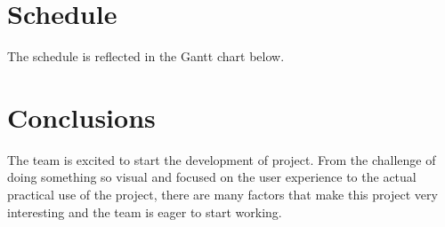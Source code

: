 \documentclass[twocolumn,twoside,11pt,a4paper]{article}
\begin{document}
\section{Schedule}\label{sec:schedule}

The schedule is reflected in the Gantt chart below.


\section{Conclusions}\label{sec:conclusions}

The team is excited to start the development of project. From the challenge of doing something so visual and focused on the user experience to the actual practical use of the project, there are many factors that make this project very interesting and the team is eager to start working.



\renewcommand{\bibname}{Referências}
%
%

%


\end{document}
